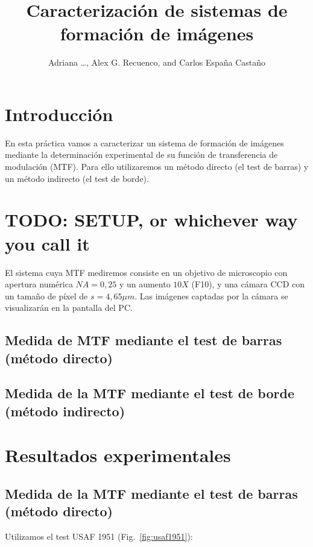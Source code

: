 \documentclass{./packages/optica-article}
\begin{document}
\title{Caracterización de sistemas de formación de imágenes}

\author{Adriana \ldots, Alex G. Recuenco, and Carlos España Castaño}

\address{Universidad Complutense de Madrid, Madrid, DC 28040, España}

\section{Introducción}
En esta práctica vamos a caracterizar un sistema de formación de imágenes mediante la determinación experimental de su función de transferencia de modulación (MTF). Para ello utilizaremos un método directo (el test de barras) y un método indirecto (el test de borde).


\section{TODO: SETUP, or whichever way you call it}


El sistema cuya MTF mediremos consiste en un objetivo de microscopio con apertura numérica $NA = 0,25$ y un aumento $10X$ (F10), y una cámara CCD con un tamaño de píxel de $s=4,65 \mu m$. Las imágenes captadas por la cámara se visualizarán en la pantalla del PC.

\subsection{Medida de MTF mediante el test de barras (método directo)}
\subsection{Medida de la MTF mediante el test de borde (método indirecto)}
\section{Resultados experimentales}

\subsection{Medida de la MTF mediante el test de barras (método directo)}

Utilizamos el test USAF 1951 (Fig.~\ref{fig:usaf1951}):
\end{document}
